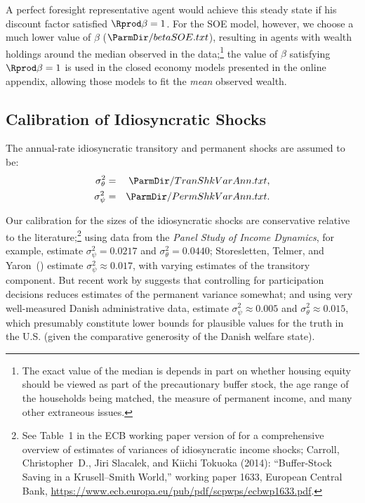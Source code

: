A perfect foresight representative agent would achieve this steady state if his discount factor satisfied ${\Rprod} \beta = 1$.  For the SOE model, however, we choose a much lower value of $\beta$ ($  \ParmDir/betaSOE.txt $), resulting in agents with wealth holdings around the median observed in the data;\footnote{The exact value of the median is depends in part on whether housing equity should be viewed as part of the precautionary buffer stock, the age range of the households being matched, the measure of permanent income, and many other extraneous issues.} the value of $\beta$ satisfying ${\Rprod} \beta = 1$ is used in the closed economy models presented in the online appendix, allowing those models to fit the \textit{mean}  observed wealth.

\subsection{Calibration of Idiosyncratic Shocks}

The annual-rate idiosyncratic transitory and permanent shocks are assumed to be:
\begin{eqnarray*}
	\sigma_{\theta}^{2} & = &  \ParmDir/TranShkVarAnn.txt ,
	\\ \sigma_{\psi}^{2}             & = &  \ParmDir/PermShkVarAnn.txt
	.
\end{eqnarray*}

Our calibration for the sizes of the idiosyncratic shocks are conservative relative to the literature;\footnote{See Table~1 in the ECB working paper version of \cite{cstKS} for a comprehensive overview of estimates of variances of idiosyncratic income shocks; Carroll, Christopher~D., Jiri Slacalek, and Kiichi Tokuoka (2014): ``Buffer-Stock Saving in a Krusell--Smith World,'' working paper 1633, European Central Bank, \url{https://www.ecb.europa.eu/pub/pdf/scpwps/ecbwp1633.pdf}.} using data from the {\it Panel Study of Income Dynamics}, for example, \cite{carroll&samwick:nature} estimate $\sigma_{\psi}^{2} = 0.0217$ and $\sigma_{\theta}^{2} = 0.0440$; Storesletten, Telmer, and Yaron~(\citeyear{sty:consumption}) estimate $\sigma_{\psi}^{2} \approx 0.017$, with varying estimates of the transitory component.  But recent work by \cite{lmpPermShocks} suggests that controlling for participation decisions reduces estimates of the permanent variance somewhat; and using very well-measured Danish administrative data, \cite{nv:risk} estimate $\sigma_{\psi}^{2} \approx 0.005$ and $\sigma_{\theta}^{2} \approx 0.015$, which presumably constitute lower bounds for plausible values for the truth in the U.S. (given the comparative generosity of the Danish welfare state).

